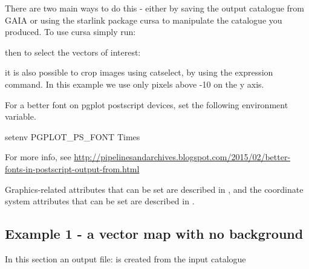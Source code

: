 There are two main ways to do this - either by saving the output
catalogue from GAIA or using the starlink package cursa to manipulate
the catalogue you produced.  To use cursa simply run:

\begin{terminalv}
\end{terminalv}

then to select the vectors of interest:

\begin{terminalv}
\end{terminalv}

it is also possible to crop images using catselect, by using the
expression command.  In this example we use only pixels above -10 on
the y axis.

\begin{terminalv}
\end{terminalv}




\begin{tip}
  For a better font on pgplot postscript devices, set the following
  environment variable.

\begin{terminalv}
setenv PGPLOT_PS_FONT Times
\end{terminalv}

For more info, see
\url{http://pipelinesandarchives.blogspot.com/2015/02/better-fonts-in-postscript-output-from.html}

Graphics-related attributes that can be set are described in
, and the coordinate system attributes that can be set are
described in .
\end{tip}





\subsection{ Example 1 - a vector map with no background}
\label{section:kappa-example1}

In this section an output file:  is created from the input
catalogue 

